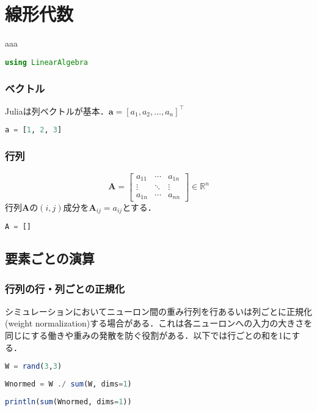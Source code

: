 \section{線形代数}
aaa
\begin{lstlisting}[language=julia]
using LinearAlgebra
\end{lstlisting}
\subsubsection{ベクトル}
Juliaは列ベクトルが基本．$\mathbf{a}=[a_1, a_2, \ldots, a_n]^\top$
\begin{lstlisting}[language=julia]
a = [1, 2, 3]
\end{lstlisting}
\subsubsection{行列}
\begin{equation}
\mathbf{A} =\left[\begin{array}{ccc}
a_{11} & \cdots & a_{1n} \\
\vdots & \ddots & \vdots  \\
a_{1n} & \cdots & a_{nn}
\end{array}\right]
\in \mathbb{R}^n
\end{equation}
行列$\mathbf{A}$の$(i, j)$成分を$\mathbf{A}_{ij}=a_{ij}$とする．
\begin{lstlisting}[language=julia]
A = []
\end{lstlisting}
\subsection{要素ごとの演算}
\subsubsection{行列の行・列ごとの正規化}
シミュレーションにおいてニューロン間の重み行列を行あるいは列ごとに正規化 (weight normalization)する場合がある．これは各ニューロンへの入力の大きさを同じにする働きや重みの発散を防ぐ役割がある．以下では行ごとの和を1にする．
\begin{lstlisting}[language=julia]
W = rand(3,3)
\end{lstlisting}
\begin{lstlisting}[language=julia]
Wnormed = W ./ sum(W, dims=1)
\end{lstlisting}
\begin{lstlisting}[language=julia]
println(sum(Wnormed, dims=1))
\end{lstlisting}
